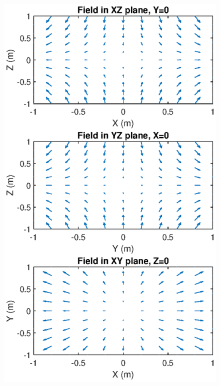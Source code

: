 \documentclass{book}
\theoremstyle{definition}
\begin{document}
\begin{figure}[!htb]
	\centering
	\begin{minipage}{.33\textwidth}
		\centering
		\includegraphics[width=\linewidth]{sim-figs/quad-1.eps}
	\end{minipage}%
	\begin{minipage}{.33\textwidth}
		\centering

\end{minipage}
\end{figure}
\end{document}
